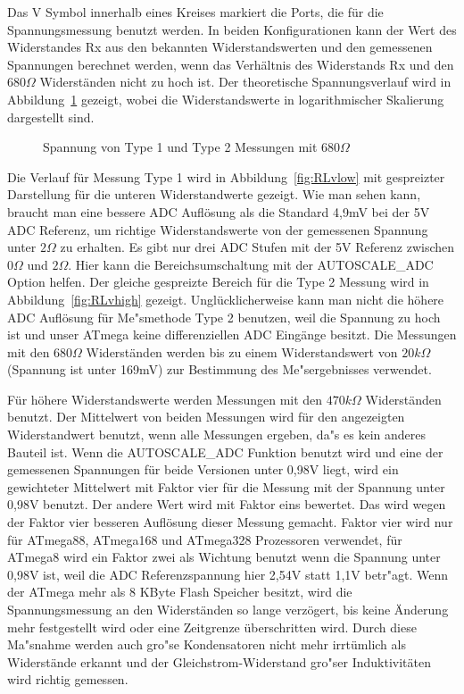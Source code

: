 Das V Symbol innerhalb eines Kreises markiert die Ports, die f\"ur die Spannungsmessung benutzt werden.
In beiden Konfigurationen kann der Wert des Widerstandes Rx aus den bekannten Widerstandswerten
und den gemessenen Spannungen berechnet werden, wenn das Verh\"altnis des Widerstands Rx und den \(680\Omega\) Widerst\"anden
 nicht zu hoch ist.
Der theoretische Spannungsverlauf wird in Abbildung~\ref{fig:RLvtot} gezeigt, wobei die Widerstandswerte 
in logarithmischer Skalierung dargestellt sind.
\begin{figure}[H]
\centering

\caption{Spannung von Type 1 und Type 2 Messungen mit \(680\Omega\) }
\label{fig:RLvtot}
\end{figure}
Die Verlauf f\"ur Messung Type 1 wird in Abbildung~\ref{fig:RLvlow} mit gespreizter Darstellung f\"ur die unteren Widerstandwerte gezeigt.
Wie man sehen kann, braucht man eine bessere ADC Aufl\"osung als die Standard 4,9mV bei der 5V ADC Referenz, um richtige
Widerstandswerte von der gemessenen Spannung unter \(2\Omega\) zu erhalten.
Es gibt nur drei ADC Stufen mit der 5V Referenz zwischen \(0\Omega\) und \(2\Omega\).
Hier kann die Bereichsumschaltung mit der AUTOSCALE\_ADC Option helfen.
Der gleiche gespreizte Bereich f\"ur die Type 2 Messung wird in Abbildung~\ref{fig:RLvhigh} gezeigt.
Ungl\"ucklicherweise kann man nicht die h\"ohere ADC Aufl\"osung f\"ur Me"smethode Type 2 benutzen,
weil die Spannung zu hoch ist und unser ATmega keine differenziellen ADC Eing\"ange besitzt.
Die Messungen mit den \(680\Omega\) Widerst\"anden werden bis zu einem Widerstandswert von 
\(20k\Omega\) (Spannung ist unter 169mV) zur Bestimmung des Me"sergebnisses verwendet.

F\"ur h\"ohere Widerstandswerte werden Messungen mit den \(470k\Omega\) Widerst\"anden benutzt.
Der Mittelwert von beiden Messungen wird f\"ur den angezeigten Widerstandwert benutzt, wenn alle Messungen ergeben,
da"s es kein anderes Bauteil ist.
Wenn die AUTOSCALE\_ADC Funktion benutzt wird und eine der gemessenen Spannungen f\"ur beide Versionen unter 0,98V liegt,
wird ein gewichteter Mittelwert mit Faktor vier f\"ur die Messung mit der Spannung unter 0,98V benutzt. Der andere Wert wird mit Faktor eins bewertet.
Das wird wegen der Faktor vier besseren Aufl\"osung dieser Messung gemacht.
Faktor vier wird nur f\"ur ATmega88, ATmega168 und ATmega328 Prozessoren verwendet, f\"ur ATmega8 wird ein
Faktor zwei als Wichtung benutzt wenn die Spannung unter 0,98V ist, weil die ADC Referenzspannung hier 2,54V statt 1,1V betr"agt.
Wenn der ATmega mehr als 8 KByte Flash Speicher besitzt, wird die Spannungsmessung an den Widerst\"anden so lange verz\"ogert,
bis keine \"Anderung mehr festgestellt wird oder eine Zeitgrenze \"uberschritten wird.
Durch diese Ma"snahme werden auch gro"se Kondensatoren nicht mehr irrt\"umlich als
Widerst\"ande erkannt und der Gleichstrom-Widerstand gro"ser Induktivit\"aten wird richtig gemessen.

